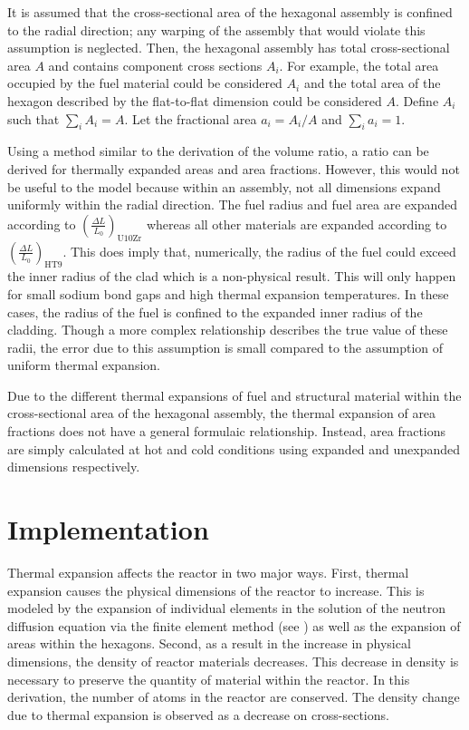     It is assumed that the cross-sectional area of the hexagonal assembly is 
    confined to the radial direction; any warping of the assembly that would
    violate this assumption is neglected. Then, the hexagonal assembly has total
    cross-sectional area $A$ and contains component cross sections $A_i$. For
    example, the total area occupied by the fuel material could be considered
    $A_i$ and the total area of the hexagon described by the flat-to-flat
    dimension could be considered $A$. Define $A_i$ such that 
    $\sum_{i} A_i = A$. Let the fractional area $a_i = A_i/A$ and 
    $\sum_{i} a_i = 1$.

    Using a method similar to the derivation of the volume ratio, a ratio can be
    derived for thermally expanded areas and area fractions. However, this would
    not be useful to the model because within an assembly, not all dimensions
    expand uniformly within the radial direction.
    The fuel radius and fuel area are expanded according to 
    $\left(\frac{\Delta L}{L_0}\right)_{\text{U10Zr}}$ whereas all other 
    materials are expanded according to 
    $\left(\frac{\Delta L}{L_0}\right)_{\text{HT9}}$. This does imply that,
    numerically, the radius of the fuel could exceed the inner radius of the 
    clad which is a non-physical result. This will only happen for small sodium 
    bond gaps and high thermal expansion temperatures. In these cases, the 
    radius of the fuel is confined to the expanded inner radius of the cladding.
    Though a more complex relationship describes the true value of these radii, 
    the error due to this assumption is small compared to the assumption of 
    uniform thermal expansion.
    
    Due to the different thermal expansions of fuel and structural material 
    within the cross-sectional area of the hexagonal assembly, the thermal 
    expansion of area fractions does not have a general formulaic relationship.
    Instead, area fractions are simply calculated at hot and cold conditions
    using expanded and unexpanded dimensions respectively. 

\section{Implementation}
  Thermal expansion affects the reactor in two major ways. First, thermal 
  expansion causes the physical dimensions of the reactor to increase. This is 
  modeled by the expansion of individual elements in the solution of the neutron 
  diffusion equation via the finite element method 
  (see ) as well as the expansion of areas within the 
  hexagons. Second, as a result in the increase in physical dimensions, the 
  density of reactor materials decreases. This decrease in density is necessary
  to preserve the quantity of material within the reactor. In this derivation,
  the number of atoms in the reactor are conserved. The density change due to 
  thermal expansion is observed as a decrease on cross-sections.

